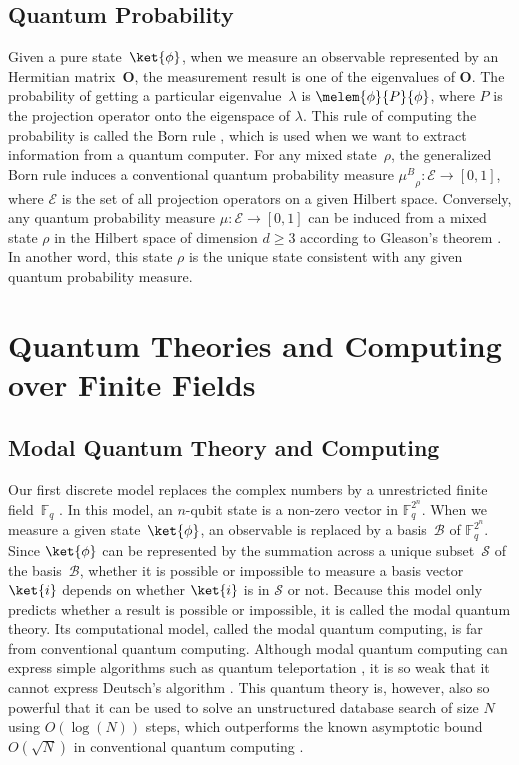 \documentclass[twoside]{iuphd}
\newcommand{\muB}{\ensuremath{\mu^{B}}}
\newcommand{\events}{\ensuremath{\mathcal{E}}}
\begin{document}
\section{Quantum Probability}

Given a pure state~$\ket{\phi}$, when we measure an observable represented
by an Hermitian matrix~$\mathbf{O}$, the measurement result is one
of the eigenvalues of $\mathbf{O}$. The probability of getting a
particular eigenvalue~$\lambda$ is $\melem{\phi}{P}{\phi}$, where
$P$ is the projection operator onto the eigenspace of $\lambda$.
This rule of computing the probability is called the Born rule \cite{Born1983,Mermin2007,Jaeger2007},
which is used when we want to extract information from a quantum computer.
For any mixed state~$\rho$, the generalized Born rule induces a
conventional quantum probability measure $\muB_{\rho}:\events\rightarrow[0,1]$,
where $\events$ is the set of all projection operators on a given
Hilbert space. Conversely, any quantum probability measure $\mu:\events\rightarrow[0,1]$
can be induced from a mixed state $\rho$ in the Hilbert space of
dimension $d\ge3$ according to Gleason's theorem \cite{gleason1957,Redhead1987-REDINA,peres1995quantum,RichmanBridges1999,Hamhalter2013}.
In another word, this state $\rho$ is the unique state consistent
with any given quantum probability measure.

\chapter{Quantum Theories and Computing over Finite Fields}

\section{Modal Quantum Theory and Computing}

Our first discrete model replaces the complex numbers by a unrestricted
finite field~$\mathbb{F}_{q}$ \cite{Schumacher2012-SCHMQT,DQT2014,SchumacherWestmoreland2010}.
In this model, an $n$-qubit state is a non-zero vector in $\mathbb{F}_{q}^{2^{n}}$.
When we measure a given state~$\ket{\phi}$, an observable is replaced
by a basis~$\mathcal{B}$ of $\mathbb{F}_{q}^{2^{n}}$. Since $\ket{\phi}$
can be represented by the summation across a unique subset~$\mathcal{S}$
of the basis~$\mathcal{B}$, whether it is possible or impossible
to measure a basis vector~$\ket{i}$ depends on whether $\ket{i}$
is in $\mathcal{S}$ or not. Because this model only predicts whether
a result is possible or impossible, it is called the modal quantum
theory. Its computational model, called the modal quantum computing,
is far from conventional quantum computing. Although modal quantum
computing can express simple algorithms such as quantum teleportation
\cite{BennettBrassardEtAl1993,peres1995quantum,Mermin2007,Jaeger2007},
it is so weak that it cannot express Deutsch's algorithm \cite{Deutsch1985,Mermin2007}.
This quantum theory is, however, also so powerful that it can be used
to solve an unstructured database search of size $N$ using $O(\log(N))$
steps, which outperforms the known asymptotic bound $O(\sqrt{N})$
in conventional quantum computing \cite{Grover:1996:FQM:237814.237866,BennettBernsteinBrassardVazirani1997,Mermin2007,Jaeger2007}.
\end{document}
